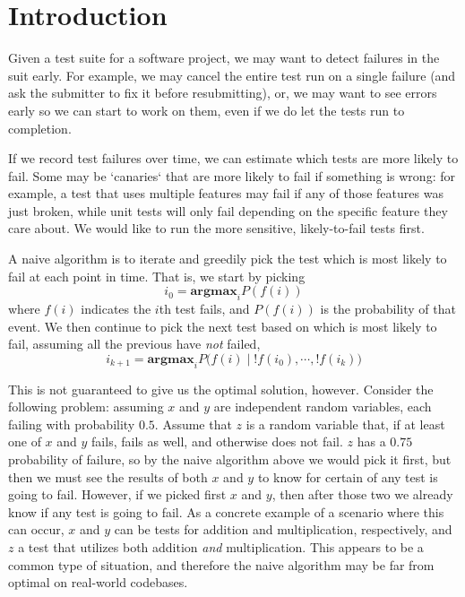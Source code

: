 \documentclass[12pt]{article}
\begin{document}
\maketitle


\section{Introduction}
Given a test suite for a software project, we may want to detect failures in the suit early. For example, we may cancel the entire test run on a single failure (and ask the submitter to fix it before resubmitting), or, we may want to see errors early so we can start to work on them, even if we do let the tests run to completion.

If we record test failures over time, we can estimate which tests are more likely to fail. Some may be `canaries` that are more likely to fail if something is wrong: for example, a test that uses multiple features may fail if any of those features was just broken, while unit tests will only fail depending on the specific feature they care about. We would like to run the more sensitive, likely-to-fail tests first.

A naive algorithm is to iterate and greedily pick the test which is most likely to fail at each point in time. That is, we start by picking
\[ i_0 = \textbf{argmax}_{i} P(f(i)) \]
where $f(i)$ indicates the $i$th test fails, and $P(f(i))$ is the probability of that event. We then continue to pick the next test based on which is most likely to fail, assuming all the previous have \emph{not} failed,
\[ i_{k+1} = \textbf{argmax}_{i} P\Big(f(i) \; \Big| \; !f(i_0), \cdots , !f(i_k) \Big) \]

This is not guaranteed to give us the optimal solution, however. Consider the following problem: assuming $x$ and $y$ are independent random variables, each failing with probability $0.5$. Assume that $z$ is a random variable that, if at least one of $x$ and $y$ fails, fails as well, and otherwise does not fail. $z$ has a $0.75$ probability of failure, so by the naive algorithm above we would pick it first, but then we must see the results of both $x$ and $y$ to know for certain of any test is going to fail. However, if we picked first $x$ and $y$, then after those two we already know if any test is going to fail. As a concrete example of a scenario where this can occur, $x$ and $y$ can be tests for addition and multiplication, respectively, and $z$ a test that utilizes both addition \emph{and} multiplication. This appears to be a common type of situation, and therefore the naive algorithm may be far from optimal on real-world codebases.

%
%
\end{document}
